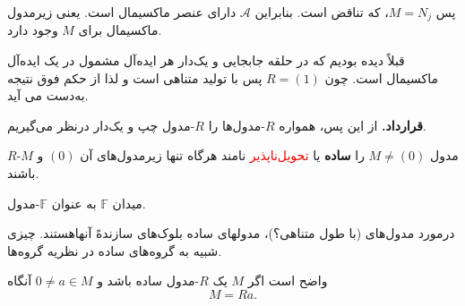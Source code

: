 \begin{frame}
    پس
    $M = N_j$، که تناقض است.
    بنابراین
    $\mathcal{A}$
    دارای عنصر ماکسیمال است.
    یعنی زیرمدول ماکسیمال برای
    \(M\)
    وجود دارد.



    \begin{corollary}
        قبلاً دیده بودیم که در حلقه جابجایی و یک‌دار
        هر ایده‌آل مشمول در یک ایده‌آل ماکسیمال است. چون
        \(R = (1)\)
        پس با تولید متناهی است و لذا از حکم فوق نتیجه به‌دست می آید.

    \end{corollary}
    \begin{remark}
        \textbf{قرارداد.} از این پس، همواره $R$-مدول‌ها را $R$-مدول چپ و یک‌دار درنظر می‌گیریم.
    \end{remark}

    \begin{definition}
        $R$-مدول $M \neq (0)$ را \textbf{ساده} یا \textcolor{red}{تحویل‌ناپذیر} نامند هرگاه تنها زیرمدول‌های آن $(0)$ و $M$ باشند.

    \end{definition}


\end{frame}






\begin{frame}
    \begin{example}
        میدان $\mathbb{F}$ به عنوان $\mathbb{F}$-مدول.

    \end{example}




    \begin{remark}
        درمورد مدول‌های (با طول متناهی؟)، مدولهای ساده بلوک‌های سازندهً آنهاهستند. چیزی شبیه به گروه‌های ساده در نظریه گروه‌‌ها.

    \end{remark}



    \begin{remark}
        واضح است اگر $M$ یک $R$-مدول ساده باشد و $0 \neq a \in M$ آنگاه
        \[
            M = Ra.
        \]

    \end{remark}

\end{frame}


